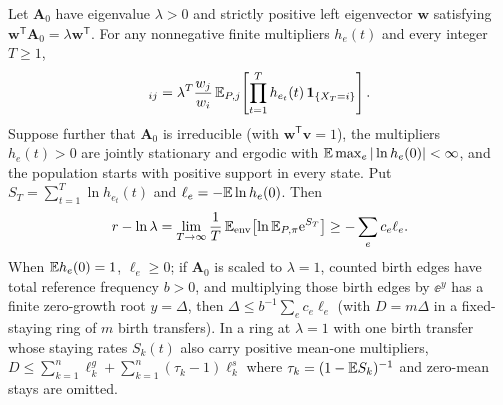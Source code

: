 \begin{proposition}\label{prop:bounds-path}
Let $\mathbf{A}_0$ have eigenvalue $\lambda > 0$ and strictly positive left eigenvector $\mathbf{w}$ satisfying $\mathbf{w}^{\mathsf{T}}\mathbf{A}_0 = \lambda\mathbf{w}^{\mathsf{T}}$. For any nonnegative finite multipliers $h_e(t)$ and every integer $T \ge 1$,
\begin{equation}
[\mathbf{A}(T)\cdots\mathbf{A}(1)]_{ij} = \lambda^T \frac{w_j}{w_i}\,\E_{P,j}\!\left[\prod_{t=1}^T h_{e_t}(t)\,\mathbf{1}_{\{X_T = i\}}\right].
\label{eq:bounds-L1}
\end{equation}
Suppose further that $\mathbf{A}_0$ is irreducible (with $\mathbf{w}^{\mathsf{T}}\mathbf{v} = 1$), the multipliers $h_e(t) > 0$ are jointly stationary and ergodic with $\mathbb{E}\max_e|\ln h_e(0)| < \infty$, and the population starts with positive support in every state. Put $S_T = \sum_{t=1}^T \ln h_{e_t}(t)$ and $\ell_e = -\mathbb{E}\ln h_e(0)$. Then
\begin{equation}
r - \ln\lambda = \lim_{T \to \infty} \frac{1}{T}\,\mathbb{E}_{\mathrm{env}}\!\left[\ln\mathbb{E}_{P,\pi}\mathrm{e}^{S_T}\right] \ge -\sum_e c_e \ell_e.
\label{eq:bounds-L2}
\end{equation}
When $\mathbb{E} h_e(0) = 1$, $\ell_e \ge 0$; if $\mathbf{A}_0$ is scaled to $\lambda = 1$, counted birth edges have total reference frequency $b > 0$, and multiplying those birth edges by $\ee^y$ has a finite zero-growth root $y = \Delta$, then $\Delta \le b^{-1}\sum_e c_e \ell_e$ (with $D = m\Delta$ in a fixed-staying ring of $m$ birth transfers). In a ring at $\lambda = 1$ with one birth transfer whose staying rates $S_k(t)$ also carry positive mean-one multipliers, $D \le \sum_{k=1}^n \ell_k^g + \sum_{k=1}^n (\tau_k - 1)\ell_k^s$ where $\tau_k = (1 - \mathbb{E} S_k)^{-1}$ and zero-mean stays are omitted.
\end{proposition}

